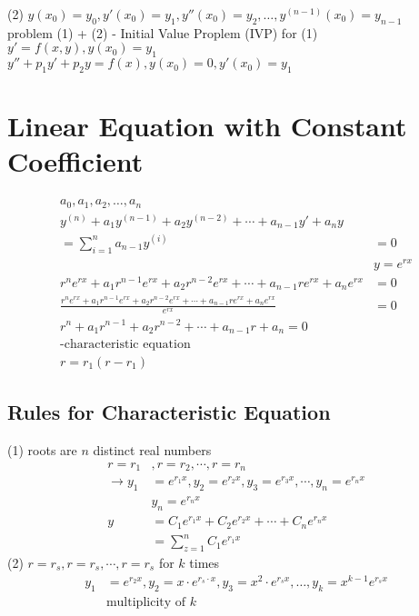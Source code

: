 \documentclass[10pt, letterpaper]{article}
\begin{document}
(2) $y(x_0) =y_0, y'(x_0)=y_1, y''(x_0)=y_2, \dots, y^{(n-1)}(x_0) =y_{n-1}$\\
problem (1) + (2) - Initial Value Proplem (IVP) for (1)\\
$y' =f(x, y), y(x_0) =y_1$\\
$y'' +p_1y' +p_2y =f(x), y(x_0) =0, y'(x_0) =y_1$

\section{Linear Equation with Constant Coefficient}
\begin{align*}
a_0, a_1, a_2, \dots, a_n\\
y^{(n)} +a_1y^{(n-1)} +a_2y^{(n-2)} +\cdots +a_{n-1}y' +a_ny\\
= \sum_{i=1}^{n} a_{n-1} y^{(i)} &= 0\\
&y=e^{rx}\\
r^ne^{rx} +a_1r^{n-1}e^{rx} +a_2r^{n-2}e^{rx} +\cdots +a_{n-1}re^{rx} +a_ne^{rx} &= 0\\
\frac{r^ne^{rx} +a_1r^{n-1}e^{rx} +a_2r^{n-2}e^{rx} +\cdots +a_{n-1}re^{rx} +a_ne^{rx}}{e^{rx}} &= 0\\
r^n +a_1r^{n-1} +a_2r^{n-2} +\cdots +a_{n-1}r +a_n = 0\\
\text{-characteristic equation}\\
r = r_1(r-r_1)
\end{align*}

\subsection{Rules for Characteristic Equation}
(1) roots are $n$ distinct real numbers\\
\begin{align*}
r=r_1 &, r=r_2, \cdots, r=r_n\\
\rightarrow y_1 &= e^{r_1x}, y_2 = e^{r_2x}, y_3 = e^{r_3x}, \cdots, y_n = e^{r_nx}\\
&y_n = e^{r_nx}\\
y &= C_1e^{r_1x} +C_2e^{r_2x} +\cdots +C_ne^{r_nx}\\
&= \sum_{z=1}^{n} C_1e^{r_1x}
\end{align*}
(2) $r=r_s, r=r_s, \cdots, r=r_s$ for $k$ times\\
\begin{align*}
y_1 &= e^{r_2x}, y_2 = x \cdot e^{r_s \cdot x}, y_3 = x^2 \cdot e^{r_sx}, \dots, y_k=x^{k-1}e^{r_sx}\\
&\text{multiplicity of }k
\end{align*}
\end{document}
